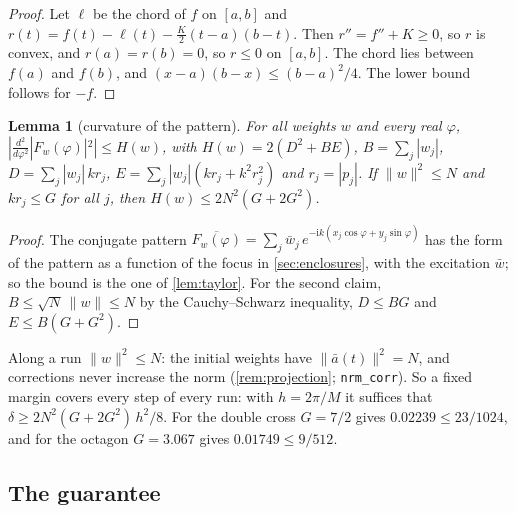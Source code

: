 \documentclass[11pt]{amsart}
\theoremstyle{plain}
\newtheorem{lemma}{Lemma}[section]
\theoremstyle{definition}
\newcommand{\thy}[1]{\texttt{#1}}
\newcommand{\ab}{\bar a}
\begin{document}
\begin{proof}
Let $\ell$ be the chord of $f$ on $[a, b]$ and $r(t) = f(t) - \ell(t) - \frac K2 (t-a)(b-t)$.  Then
$r'' = f'' + K \ge 0$, so $r$ is convex, and $r(a) = r(b) = 0$, so $r \le 0$ on $[a, b]$.  The chord lies
between $f(a)$ and $f(b)$, and $(x-a)(b-x) \le (b-a)^2/4$.  The lower bound follows for $-f$.
\end{proof}



\begin{lemma}[curvature of the pattern]\label{lem:curv}
For all weights $w$ and every real $\varphi$, $|\frac{d^2}{d\varphi^2}|F_w(\varphi)|^2| \le H(w)$, with
$H(w) = 2(D^2 + BE)$, $B = \sum_j |w_j|$, $D = \sum_j |w_j|\, k r_j$, $E = \sum_j |w_j|(k r_j + k^2 r_j^2)$
and $r_j = |p_j|$.  If $\|w\|^2 \le N$ and $k r_j \le G$ for all $j$, then $H(w) \le 2N^2(G + 2G^2)$.
\end{lemma}

\begin{proof}
The conjugate pattern $\overline{F_w(\varphi)} = \sum_j \bar w_j\, e^{-\mathrm{i} k (x_j \cos\varphi + y_j \sin\varphi)}$
has the form of the pattern as a function of the focus in \cref{sec:enclosures}, with the excitation
$\bar w$; so the bound is the one of \cref{lem:taylor}.  For the second claim, $B \le \sqrt N\, \|w\| \le N$
by the Cauchy--Schwarz inequality, $D \le BG$ and $E \le B(G + G^2)$.
\end{proof}

Along a run $\|w\|^2 \le N$: the initial weights have $\|\ab(t)\|^2 = N$, and corrections never increase
the norm (\cref{rem:projection}; \thy{nrm\_corr}).  So a fixed margin covers every step of every run:
with $h = 2\pi/M$ it suffices that $\delta \ge 2N^2(G + 2G^2)\, h^2/8$.  For the double cross $G = 7/2$
gives $0.02239 \le 23/1024$, and for the octagon $G = 3.067$ gives $0.01749 \le 9/512$.






\subsection{The guarantee}
\end{document}
